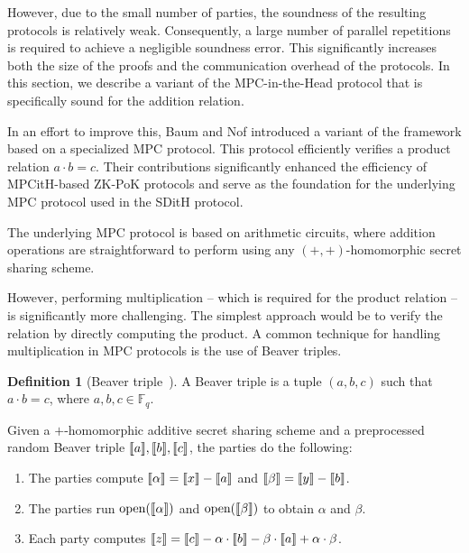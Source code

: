 \documentclass[11pt]{report}
\theoremstyle{definition}
\newtheorem{definition}{Definition}[section]
\theoremstyle{plain}
\begin{document}
However, due to the small number of parties, the soundness of the resulting protocols is relatively weak. Consequently, a large number of parallel repetitions is required to achieve a negligible soundness error. This significantly increases both the size of the proofs and the communication overhead of the protocols. In this section, we describe a variant of the MPC-in-the-Head protocol that is specifically sound for the addition relation.

In an effort to improve this, Baum and Nof introduced a variant of the framework based on a specialized MPC protocol. This protocol efficiently verifies a product relation $a \cdot b = c$. Their contributions significantly enhanced the efficiency of MPCitH-based ZK-PoK protocols and serve as the foundation for the underlying MPC protocol used in the SDitH protocol.

The underlying MPC protocol is based on arithmetic circuits, where addition operations are straightforward to perform using any $(+,+)$-homomorphic secret sharing scheme. 

However, performing multiplication -- which is required for the product relation -- is significantly more challenging. The simplest approach would be to verify the relation by directly computing the product. A common technique for handling multiplication in MPC protocols is the use of Beaver triples.

\begin{definition}[Beaver triple~\cite{Beaver1992efficient}]\label{def:Beaver}
  A Beaver triple is a tuple $ (a, b, c) $ such that $ a \cdot b = c $, where $ a, b, c \in \mathbb{F}_q $.
\end{definition}

\begin{protocol}\label{def:Beaver-multiplication}
  Given a $+$-homomorphic additive secret sharing scheme and a preprocessed random Beaver triple $\llbracket a \rrbracket, \llbracket b \rrbracket, \llbracket c \rrbracket $, the parties do the following:
  \begin{enumerate}[parsep=0pt, itemsep=0pt, topsep=0pt]
    \item The parties compute $ \llbracket \alpha \rrbracket = \llbracket x \rrbracket - \llbracket a \rrbracket $ and $ \llbracket \beta \rrbracket = \llbracket y \rrbracket - \llbracket b \rrbracket $.
    \item The parties run $ \text{open}(\llbracket \alpha \rrbracket) $ and $ \text{open}(\llbracket \beta \rrbracket) $ to obtain $ \alpha $ and $ \beta $.
    \item Each party computes $ \llbracket z \rrbracket = \llbracket c \rrbracket - \alpha \cdot \llbracket b \rrbracket - \beta \cdot \llbracket a \rrbracket + \alpha \cdot \beta $.
  \end{enumerate}
\end{protocol}
\end{document}

